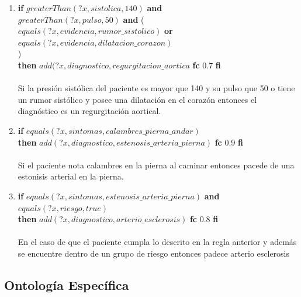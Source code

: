 \documentclass[10pt, a4paper,spanish]{article}
\begin{document}
\begin{enumerate}[label={\textbf{R\theenumi:}}]
				\item
					\textbf{if} $greaterThan(?x, sistolica, 140)$ \textbf{and} \\
						\hspace*{0.5cm} $greaterThan(?x, pulso, 50)$ \textbf{and} ( \\
							\hspace*{1cm} $equals(?x, evidencia, rumor\_sistolico)$  \textbf{or}\\
							\hspace*{1cm} $equals(?x, evidencia, dilatacion\_corazon)$ \\
						\hspace*{0.5cm} ) \\
					\textbf{then} $add(?x, diagnostico, regurgitacion\_aortica$ \textbf{fc} $0.7$ \textbf{fi}
					\\ \\
					Si la presión sistólica del paciente es mayor que 140 y su pulso que 50 o tiene un rumor sistólico y posee una dilatación en el corazón entonces el diagnóstico es un regurgitación aortical.

				\item
					\textbf{if} $equals(?x, sintomas, calambres\_pierna\_andar)$ \\
					\textbf{then} $add(?x, diagnostico, estenosis\_arteria\_pierna)$ \textbf{fc} $0.9$ \textbf{fi}
					\\ \\
					Si el paciente nota calambres en la pierna al caminar entonces pacede de una estonisis arterial en la pierna.

				\item
					\textbf{if} $equals(?x, sintomas, estenosis\_arteria\_pierna)$ \textbf{and} \\
						\hspace*{0.5cm}	$equals(?x, riesgo, true)$ \\
					\textbf{then} $add(?x, diagnostico, arterio\_esclerosis)$ \textbf{fc} $0.8$ \textbf{fi}
					\\ \\
					En el caso de que el paciente cumpla lo descrito en la regla anterior y además se encuentre dentro de un grupo de riesgo entonces padece arterio esclerosis
			\end{enumerate}

		\subsection{Ontología Específica}
\end{document}
